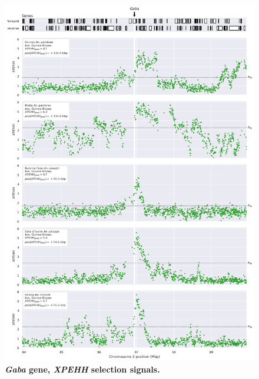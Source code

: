 \documentclass[a4paper,11pt,abstracton,hidelinks]{scrartcl}
\begin{document}
\begin{figure}[t!]
	\begin{center}
		\includegraphics*[width=1\linewidth,center]{artwork/locus_gaba_xpehh_pdist.png}
	\end{center}
	\caption[\textit{Gaba} gene, \textit{XPEHH} selection signals]{
	\textbf{\textit{Gaba} gene, \textit{XPEHH} selection signals.}
	} 
	\label{fig:locus_gaba_xpehh}
\end{figure}


\clearpage
\end{document}
